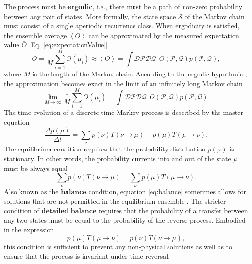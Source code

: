 \documentclass[12pt]{report}
\begin{document}
The process must be \textbf{ergodic}, i.e., there must be a path of non-zero probability between any pair of states. More formally, the state space $\mathcal{S}$ of the Markov chain must consist of a single aperiodic recurrence class. When ergodicity is satisfied, the ensemble average $\left\langle O \right\rangle$ can be approximated by the measured expectation value $\bar{O}$ [Eq. \ref{eq:expectationValue}] 
%
\begin{equation}
\label{eq:approximationOfExpectationValues}
\bar{O} = \frac{1}{M}\sum_{i = 1}^{M} O(\mu_{i}) \approx \left\langle O \right\rangle = \int \mathcal{DP}\mathcal{DQ} \:\: O(\mathcal{P},\mathcal{Q})
p(\mathcal{P},\mathcal{Q}),
\end{equation}
%
where $M$ is the length of the Markov chain. According to the ergodic hypothesis \cite{Tuckerman2010}, the approximation becomes exact in the limit of an infinitely long Markov chain
%
\begin{equation}
\label{eq:ergodicHyp}
\lim_{M\rightarrow \infty}\frac{1}{M}\sum_{i = 1}^{M} O(\mu_{i}) = \int \mathcal{DP}\mathcal{DQ} \:\: O(\mathcal{P},\mathcal{Q})
p(\mathcal{P},\mathcal{Q}).
\end{equation}
%
%
The time evolution of a discrete-time Markov process is described by the master equation
%
\begin{equation}
\label{eq:MasterEquation}
\frac{\Delta p(\mu)}{\Delta t} = \sum_{\nu} p(\nu)T\left(\nu \rightarrow \mu\right) - p(\mu)T\left(\mu \rightarrow \nu\right).
\end{equation}
%
The equilibrium condition requires that the probability distribution $p(\mu)$ is stationary. In other words, the probability currents into and out of the state $\mu$ must be always equal
\begin{equation}
\label{eq:balance}
\sum_{\nu} p(\nu)T\left(\nu \rightarrow \mu\right) = \sum_{\nu} p(\mu)T\left(\mu \rightarrow \nu\right).
\end{equation}
%
Also known as the $\textbf{balance}$ condition, equation \ref{eq:balance} sometimes allows for solutions that are not permitted in the equilibrium ensemble \cite{Landau2000}. The stricter condition of $\textbf{detailed balance}$ requires that the probability of a transfer between any two states must be equal to the probability of the reverse process. Embodied in the expression
%
\begin{equation}
\label{eq:detailedBalance}
p(\mu)T\left(\mu \rightarrow \nu\right) = p(\nu)T\left(\nu \rightarrow \mu\right),
\end{equation} 
%
this condition is sufficient to prevent any non-physical solutions as well as to ensure that the process is invariant under time reversal.
\end{document}
